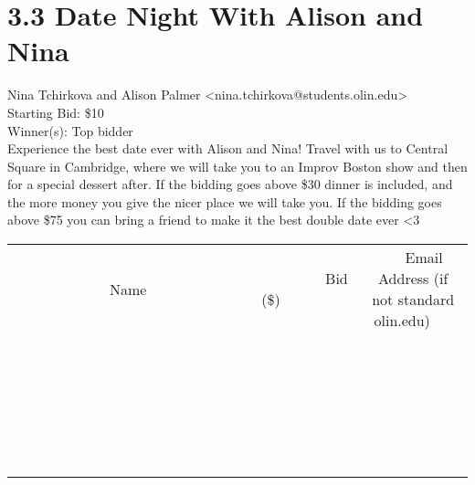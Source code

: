\documentclass[11pt]{article}
\begin{document}
					\section*{3.3 Date Night With Alison and Nina}
					Nina Tchirkova and Alison Palmer <nina.tchirkova@students.olin.edu> \\
					Starting Bid: \$10 \\
					Winner(s): Top bidder \\
					Experience the best date ever with Alison and Nina! Travel with us to Central Square in Cambridge, where we will take you to an Improv Boston show and then for a special dessert after. If the bidding goes above \$30 dinner is included, and the more money you give the nicer place we will take you. If the bidding goes above \$75 you can bring a friend to make it the best double date ever \textless 3 \\
					[6ex]
					\begin{tabular}{c c c}
						~~~~~~~~~~~~~Name~~~~~~~~~~~~~ & ~~~~~~~~~Bid (\$)~~~~~~~~~ & ~~~Email Address (if not standard olin.edu)~~~ \\
				
 & & \\
\hline
 & & \\
\hline
 & & \\
\hline
 & & \\
\hline
 & & \\
\hline
 & & \\
\hline
 & & \\
\hline
 & & \\
\hline
 & & \\
\hline
 & & \\
\hline
 & & \\
\hline
 & & \\
\hline
 & & \\
\hline
 & & \\
\hline
 & & \\
\hline
 & & \\
\hline
 & & \\
\hline
 & & \\
\hline
 & & \\
\hline
 & & \\
\hline
 & & \\
\hline
 & & \\
\hline
 & & \\
\hline
 & & \\
\hline
 & & \\
\hline
 & & \\
\hline
					\end{tabular}
					\clearpage
				
\end{document}
